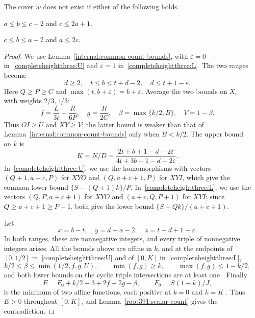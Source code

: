 \begin{lemma}
\label{completeheightthree:moderate}
The cover $w$ does not exist if either of the following holds.
\begin{props}
\item $a\le b\le c-2$ and $c\le2a+1$.\label{completeheightthree:U}
\item $c\le b\le a-2$ and $a\le2c$.\label{completeheightthree:L}
\end{props}
\end{lemma}
\begin{proof}
We use Lemma~\ref{internal:common-count-bounds}, with $\varepsilon=0$ in~\ref{completeheightthree:U} and $\varepsilon=1$ in~\ref{completeheightthree:L}. The two ranges become
\[
 d\ge2,\quad t\le b\le t+d-2,\quad d\le t+1-\varepsilon.
\]
Here $Q\ge P\ge C$ and $\max(t,b+\varepsilon)=b+\varepsilon$.
Average the two bounds on $X_\varepsilon$ with weights $2/3,1/3$:
\begin{equation}\label{completeheightthree:upper-floors}
 f=\frac{L}{3t}+\frac{R}{6P},\quad g=\frac{R}{2C},\quad
 \beta=\max\{k/2,B\},\quad V=1-\beta.
\end{equation}
Thus $OI\ge U$ and $XY\ge V$; the latter bound is weaker than that of Lemma~\ref{internal:common-count-bounds}
only when $B<k/2$. The upper bound on $k$ is
\begin{equation}\label{completeheightthree:upper-K}
 K=N/D=\frac{2t+b+1-d-2\varepsilon}{4t+3b+1-d-2\varepsilon}.
\end{equation}
In~\ref{completeheightthree:U}, we use the homomorphisms with vectors
$(Q+1,a+c,P)$ for $XYO$ and $(Q,a+c+1,P)$ for $XYI$, which give the
common lower bound $\{S-(Q+1)k\}/P$.
In~\ref{completeheightthree:L}, we use the vectors $(Q,P,a+c+1)$ for $XYO$ and $(a+c,Q,P+1)$
for $XYI$; since $Q\ge a+c+1\ge P+1$, both give the lower bound
$\{S-Qk\}/(a+c+1)$.

Let
\begin{equation}\label{completeheightthree:upper-vars}
 x=b-t,\quad y=d-x-2,\quad z=t-d+1-\varepsilon.
\end{equation}
In both ranges, these are nonnegative integers, and every triple of nonnegative integers arises.
All the bounds above are affine in $k$, and at the endpoints of $[0,1/2]$
in~\ref{completeheightthree:U} and of $[0,K]$ in~\ref{completeheightthree:L},
\begin{equation}\label{completeheightthree:base}
 k/2\le\beta\le\min(1/2,f,g,U),\qquad
 \min(f,g)\ge k,\qquad\max(f,g)\le1-k/2,
\end{equation}
and both lower bounds on the cyclic triple intersections are at least one .
Finally
\begin{equation}\label{completeheightthree:E}
 E=F_0+k/2-3+2f+2g-\beta,\qquad F_0=S(1-k)/J,
\end{equation}
is the minimum of two affine functions, each positive at $k=0$ and
$k=K$ . Thus $E>0$ throughout $[0,K]$, and
Lemma~\ref{root391:scalar-count} gives the contradiction.
\end{proof}


